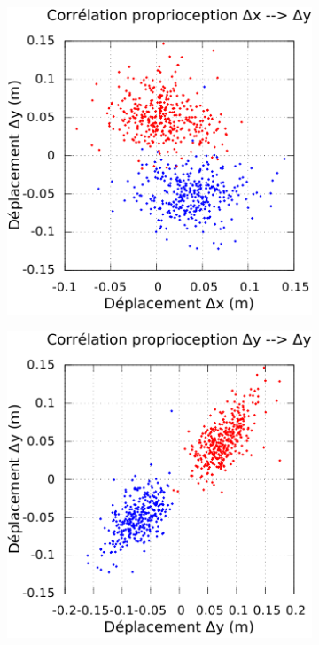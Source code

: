 \begin{figure}[htbp]
\begin{subfigure}{0.22\paperwidth}
    \end{subfigure}
    \vspace{0.2cm}
    \newline
    \begin{subfigure}{0.22\paperwidth}
        \centering
        \includegraphics[type=pdf,ext=.pdf,read=.pdf,width=1.0\linewidth]{../plot/OdometryLWPR/grass_close_function_read_x_y}
    \end{subfigure}
    \begin{subfigure}{0.22\paperwidth}
        \centering
        \includegraphics[type=pdf,ext=.pdf,read=.pdf,width=1.0\linewidth]{../plot/OdometryLWPR/grass_close_function_read_y_y}

\end{subfigure}
\end{figure}
